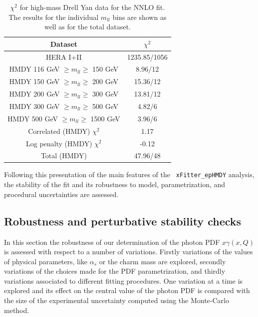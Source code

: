 \begin{table}[t]
  \centering
  \begin{tabular}{|c|c|}
    \hline
    Dataset  &   $\chi^2$ \\
    \hline
    \hline
    HERA I+II & 1235.85/1056\\
    \hline
    HMDY  116 GeV $\ge m_{ll} \ge $ 150 GeV  &  8.96/12 \\
    HMDY  150 GeV $\ge m_{ll} \ge $ 200 GeV  &  15.36/12 \\
    HMDY  200 GeV $\ge m_{ll} \ge $ 300 GeV  &  13.81/12 \\
    HMDY  300 GeV $\ge m_{ll} \ge $ 500 GeV  &  4.82/6 \\
    HMDY  500 GeV $\ge m_{ll} \ge $ 1500 GeV &  3.96/6 \\
    \hline
    Correlated (HMDY) $\chi^2$ & 1.17 \\
    Log penalty (HMDY) $\chi^2$  & -0.12 \\
    \hline
    \hline
    Total  (HMDY) & 47.96/48 \\
    \hline
    \end{tabular}
  \caption{$\chi^{2}$ for high-mass Drell Yan data for the NNLO fit.
    The results for the individual $m_{ll}$ bins are shown
    as well as for the total dataset.
\label{tab:chi2fit}
  }
\end{table}


Following this presentation of the main features of the {\tt
  xFitter\_epHMDY} analysis, the stability of the fit and its robustness
to model, parametrization, and procedural uncertainties are assessed.

\subsection{Robustness and perturbative stability checks}

In this section the robustness of our determination of the
photon PDF $x\gamma(x,Q)$ is assessed with respect to a number of variations.
Firstly variations of the values of
physical parameters, like $\alpha_s$ or the charm mass are explored, secondly
variations of the choices made for the PDF parametrization, and thirdly 
variations associated to different fitting procedures.
%
One variation at a time is explored and its effect on the
central value of the photon PDF is compared with the size of the experimental
uncertainty computed using the Monte-Carlo method.

